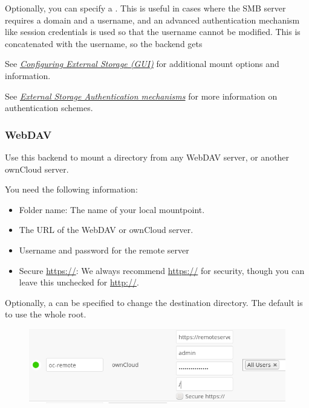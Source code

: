 \documentclass[letterpaper,10pt,english]{sphinxmanual}
\begin{document}
Optionally, you can specify a . This is useful in
cases where the
SMB server requires a domain and a username, and an advanced authentication
mechanism like session credentials is used so that the username cannot be
modified. This is concatenated with the username, so the backend gets
\begin{figure}[htbp]
\centering

\end{figure}

See {\hyperref[configuration_files/external_storage_configuration_gui::doc]{\emph{Configuring External Storage (GUI)}}} for additional mount
options and information.

See {\hyperref[configuration_files/external_storage/auth_mechanisms::doc]{\emph{External Storage Authentication mechanisms}}} for more information on authentication schemes.


\subsubsection{WebDAV}
\label{configuration_files/external_storage/webdav::doc}\label{configuration_files/external_storage/webdav:webdav}
Use this backend to mount a directory from any WebDAV server, or another
ownCloud server.

You need the following information:
\begin{itemize}
\item {} 
Folder name: The name of your local mountpoint.

\item {} 
The URL of the WebDAV or ownCloud server.

\item {} 
Username and password for the remote server

\item {} 
Secure \href{https://}{https://}: We always recommend \href{https://}{https://} for security, though you can
leave this unchecked for \href{http://}{http://}.

\end{itemize}

Optionally, a  can be specified to change the destination
directory. The default is to use the whole root.
\begin{figure}[htbp]
\centering

\includegraphics{webdav.png}
\end{figure}
\end{document}
